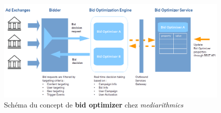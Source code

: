         \begin{figure}
            \includegraphics[width=\linewidth]{images/bid-optimization-engine-and-bid-optimizer.png}
            \caption{Schéma du concept de \textbf{bid optimizer} chez \emph{mediarithmics}}
            \label{fig:bid-optimization}
        \end{figure}
